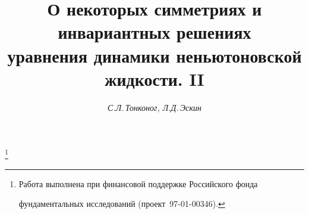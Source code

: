 









\newcommand{\lu}{\mathrm{l}}


\newcommand{\ru}{\mathrm{r}}




\newcommand{\col}{\operatorname{col}}


\newcommand{\vraisup}{\operatorname{vrai~sup}}


\newcommand{\tts}[1]{}












\setcounter{page}{55}












\author{\it С.Л.\,Тонконог, Л.Д.\,Эскин}




\title{О некоторых симметриях и инвариантных решениях\\


уравнения динамики неньютоновской жидкости. II}





\thanks{Работа выполнена при финансовой поддержке Российского фонда


фундаментальных исследований (проект \No\,97-01-00346).}


\date{}


